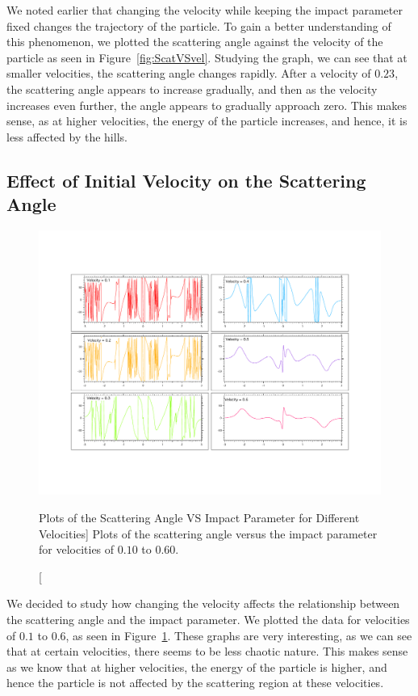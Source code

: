 \documentclass[12pt]{article} %
\begin{document}
We noted earlier that changing the velocity while keeping the impact parameter fixed changes the trajectory of the particle. To gain a better understanding of this phenomenon, we plotted the scattering angle against the velocity of the particle as seen in Figure~\ref{fig:ScatVSvel}. Studying the graph, we can see that at smaller velocities, the scattering angle changes rapidly. After a velocity of $0.23$, the scattering angle appears to increase gradually, and then as the velocity increases even further, the angle appears to gradually approach zero. This makes sense, as at higher velocities, the energy of the particle increases, and hence, it is less affected by the hills.




\subsection{Effect of Initial Velocity on the Scattering Angle}

\begin{figure}[H]
	\begin{center}
		\includegraphics[width=1.1\linewidth]{bAtDifV}
		\caption
		[Plots of the Scattering Angle VS Impact Parameter for Different Velocities]
		{Plots of the scattering angle versus the impact parameter for velocities of $0.10$ to $0.60$.}
		\label{fig:bAtDifV}
	\end{center}
\end{figure}

We decided to study how changing the velocity affects the relationship between the scattering angle and the impact parameter. We plotted the data for velocities of $0.1$ to $0.6$, as seen in Figure~\ref{fig:bAtDifV}. These graphs are very interesting, as we can see that at certain velocities, there seems to be less chaotic nature. This makes sense as we know that at higher velocities, the energy of the particle is higher, and hence the particle is not affected by the scattering region at these velocities.
\end{document}
